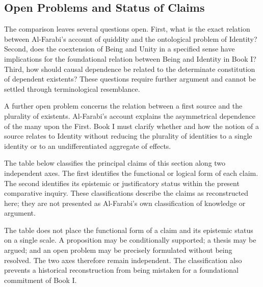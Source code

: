 \subsection{Open Problems and Status of Claims}
\label{subsec:ch08-farabi-open-problems}

\label{para:VS.B01.P01.C08.S12.SS16.P001}

The comparison leaves several
questions open. First, what
is the exact relation between
Al-Farabi's account of
quiddity and the ontological
problem of Identity? Second,
does the coextension of
Being and Unity in a
specified sense have
implications for the
foundational relation
between Being and Identity
in Book I? Third, how
should causal dependence
be related to the
determinate constitution
of dependent existents?
These questions require
further argument and
cannot be settled through
terminological resemblance.

\label{para:VS.B01.P01.C08.S12.SS16.P002}

A further open problem
concerns the relation
between a first source
and the plurality of
existents. Al-Farabi's
account explains the
asymmetrical dependence
of the many upon the
First. Book I must
clarify whether and
how the notion of a
source relates to
Identity without
reducing the plurality
of identities to a
single identity or
to an undifferentiated
aggregate of effects.

\label{para:VS.B01.P01.C08.S12.SS16.P003}

The table below classifies
the principal claims of
this section along two
independent axes. The
first identifies the
functional or logical
form of each claim.
The second identifies
its epistemic or
justificatory status
within the present
comparative inquiry.
These classifications
describe the claims
as reconstructed here;
they are not presented
as Al-Farabi's own
classification of
knowledge or argument.



\label{para:VS.B01.P01.C08.S12.SS16.P004}

The table does not place
the functional form of
a claim and its epistemic
status on a single scale.
A proposition may be
conditionally supported;
a thesis may be argued;
and an open problem may
be precisely formulated
without being resolved.
The two axes therefore
remain independent.
The classification also
prevents a historical
reconstruction from
being mistaken for
a foundational commitment
of Book I.


